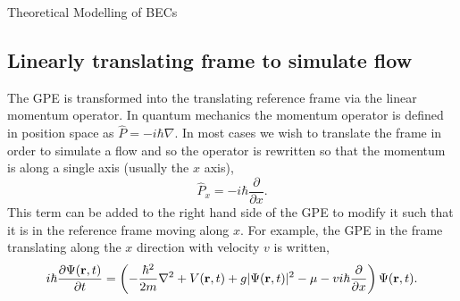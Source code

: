 \begin{chapter}{\label{cha:theoretical_model}Theoretical Modelling of BECs}
	\subsection{\label{section:linearmovframe} Linearly translating frame to simulate flow}
	The GPE is transformed into the translating reference frame via the linear momentum operator. In quantum mechanics the momentum operator is defined in position space as $\hat{P} = -i\hbar\nabla$. In most cases we wish to translate the frame in order to simulate a flow and so the operator is rewritten so that the momentum is along a single axis (usually the $x$ axis),
	\begin{equation*}
	\hat{P}_x = -i\hbar\frac{\partial}{\partial x}.
	\end{equation*}
	This term can be added to the right hand side of the GPE to modify it such that it is in the reference frame moving along $x$. For example, the GPE in the frame translating along the $x$ direction with velocity $v$ is written,
	\begin{equation}\label{eq:linearframegpe}
	i\hbar \frac{\partial\Psi({\bf r},t)}{\partial t} = \left(-\frac{\hbar^2}{2m}\nabla^2 + V({\bf r},t) + g|\Psi({\bf r},t)|^2 - \mu -vi\hbar\frac{\partial}{\partial x} \right ) \Psi({\bf r},t).
	\end{equation}


\end{chapter}
